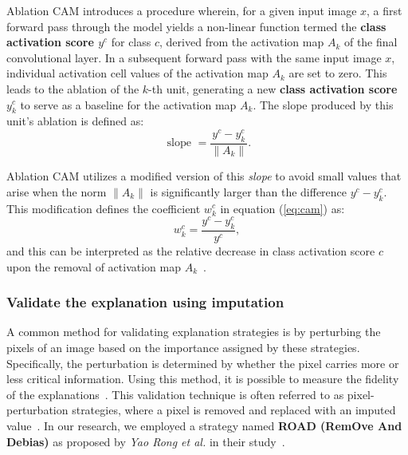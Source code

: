Ablation CAM introduces a procedure wherein, for a given input image \(x\), a first forward pass through the model yields a non-linear function termed the \textbf{class activation score \(y^{c}\)} for class \(c\), derived from the activation map \(A_k\) of the final convolutional layer. In a subsequent forward pass with the same input image \(x\), individual activation cell values of the activation map \(A_k\) are set to zero. This leads to the ablation of the \(k\)-th unit, generating a new \textbf{class activation score \(y^{c}_{k}\)} to serve as a baseline for the activation map \(A_k\). The slope produced by this unit's ablation is defined as:
\begin{equation}
\text { slope }=\frac{y^c-y_k^c}{\left\|A_k\right\|}.
\end{equation}

Ablation CAM utilizes a modified version of this \textit{slope} to avoid small values that arise when the norm \(\|A_k\|\) is significantly larger than the difference \(y^c - y^c_k\). This modification defines the coefficient \(w_{k}^c\) in equation (\ref{eq:cam}) as:
\begin{equation}
w_k^c=\frac{y^c-y_k^c}{y^c},
\end{equation}
and this can be interpreted as the relative decrease in class activation score \(c\) upon the removal of activation map \(A_k\)~\cite{9093360}.

\subsubsection{Validate the explanation using imputation} \label{subsubsec:road}
A common method for validating explanation strategies is by perturbing the pixels of an image based on the importance assigned by these strategies. Specifically, the perturbation is determined by whether the pixel carries more or less critical information. Using this method, it is possible to measure the fidelity of the explanations~\cite{DBLP:journals/corr/abs-1912-01451}. This validation technique is often referred to as pixel-perturbation strategies, where a pixel is removed and replaced with an imputed value~\cite{DBLP:journals/corr/SamekBMBM15, DBLP:journals/corr/abs-1912-01451}. In our research, we employed a strategy named \textbf{ROAD (RemOve And Debias)} as proposed by \textit{Yao Rong et al.} in their study~\cite{DBLP:journals/corr/abs-2202-00449}.\\

